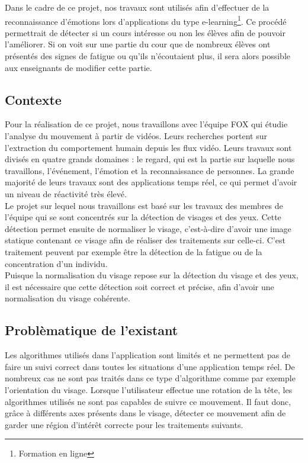 Dans le cadre de ce projet, nos travaux sont utilisés afin d'effectuer de la reconnaissance d'émotions lors d'applications
du type e-learning\footnote{Formation en ligne}. Ce procédé permettrait de détecter si un cours 
intéresse ou non les élèves afin de pouvoir l'améliorer. Si on voit sur une partie du cour
que de nombreux élèves ont présentés des signes de fatigue ou qu'ils n'écoutaient plus, il sera
alors possible aux enseignants de modifier cette partie.\\


\subsection{Contexte}
Pour la réalisation de ce projet, nous travaillons avec l'équipe FOX qui étudie
l'analyse du mouvement à partir de vidéos. Leurs recherches portent
sur l'extraction du comportement humain depuis les flux vidéo.  Leurs travaux sont
divisés en quatre grands domaines : le regard, qui est la partie sur laquelle nous travaillons, l'événement, l'émotion et la
reconnaissance de personnes. La grande majorité de leurs travaux sont
des applications temps réel, ce qui permet d'avoir un niveau de réactivité très élevé.\\ 

Le projet sur lequel nous travaillons est basé sur les travaux des membres de l'équipe qui se sont concentrés sur la
détection de visages et des yeux. Cette détection permet ensuite de normaliser le visage, c'est-à-dire
d'avoir une image statique contenant ce visage afin de réaliser des traitements sur celle-ci. C'est
traitement peuvent par exemple être la détection de la fatigue ou de la concentration d'un individu.\\

Puisque la normalisation du visage repose sur la détection du visage et des yeux, il est nécessaire que cette 
détection soit correct et précise, afin d'avoir une normalisation du visage cohérente.\\

\subsection{Problèmatique de l'existant}
Les algorithmes utilisés dans l'application sont limités et ne permettent pas de faire un suivi correct
dans toutes les situations d'une application temps réel. De nombreux cas ne sont
pas traités dans ce type d'algorithme comme par exemple l'orientation du visage. Lorsque
l'utilisateur effectue une rotation de la tête, les algorithmes utilisés ne sont pas capables
de suivre ce mouvement. Il faut donc, grâce à différents axes présents dans le visage, détecter
ce mouvement afin de garder une région d'intérêt correcte pour les traitements suivants.\\

